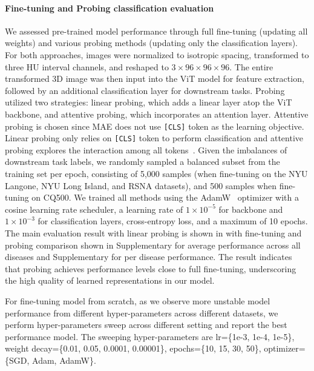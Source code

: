 \documentclass[fleqn,10pt]{wlscirep}
\begin{document}
\paragraph{Fine-tuning and Probing classification evaluation}
We assessed pre-trained model performance through full fine-tuning (updating all weights) and various probing methods (updating only the classification layers). For both approaches, images were normalized to isotropic spacing, transformed to three HU interval channels, and reshaped to $3\times96\times96\times96$. The entire transformed 3D image was then input into the ViT model for feature extraction, followed by an additional classification layer for downstream tasks. Probing utilized two strategies: linear probing, which adds a linear layer atop the ViT backbone, and attentive probing, which incorporates an attention layer. Attentive probing is chosen since MAE does not use \texttt{[CLS]} token as the learning objective. Linear probing only relies on \texttt{[CLS]} token to perform classification and attentive probing explores the interaction among all tokens~\cite{Chen2024}. Given the imbalances of downstream task labels, we randomly sampled a balanced subset from the training set per epoch, consisting of 5,000 samples (when fine-tuning on the NYU Langone, NYU Long Island, and RSNA datasets), and 500 samples when fine-tuning on CQ500. We trained all methods using the AdamW~\cite{loshchilov2018decoupled} optimizer with a cosine learning rate scheduler, a learning rate of $1\times10^{-5}$ for backbone and $1\times10^{-3}$ for classification layers, cross-entropy loss, and a maximum of 10 epochs. The main evaluation result with linear probing is shown in  with fine-tuning and probing comparison shown in Supplementary  for average performance across all diseases and Supplementary  for per disease performance. The result indicates that probing achieves performance levels close to full fine-tuning, underscoring the high quality of learned representations in our model.

For fine-tuning model from scratch, as we observe more unstable model performance from different hyper-parameters across different datasets, we perform hyper-parameters sweep across different setting and report the best performance model. The sweeping hyper-parameters are lr=\{1e-3, 1e-4, 1e-5\}, weight decay=\{0.01, 0.05, 0.0001, 0.00001\}, epochs=\{10, 15, 30, 50\}, optimizer=\{SGD, Adam, AdamW\}.
\end{document}
